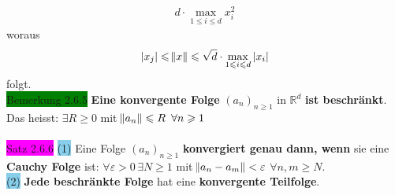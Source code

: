 \documentclass[landscape, 10pt]{article}
\newcommand{\R}{\mathbb{R}}
\begin{document}
\begin{multicols}{3}
\begin{align*}
                            d\cdot \max\limits_{1\leqslant i\leqslant d}x_i^2
                     \end{align*}
                     woraus 
                     \begin{equation*}
                            |x_j|\leqslant \norm{x}\leqslant
                            \sqrt{d}\cdot\max
                            \limits_{1\leqslant i\leqslant d}|x_i|
                     \end{equation*}
                     folgt.\\
              \colorbox{green}{Bemerkung 2.6.5} 
                     \textbf{Eine konvergente Folge} 
                     \textcolor{NavyBlue}{$(a_n)_{n\geqslant1}$} in 
                     \textcolor{NavyBlue}{$\R^d$}
                     \textbf{ist beschränkt}. Das heisst: 
                     \textcolor{NavyBlue}{$\exists R\geqslant0$} mit 
                     \textcolor{NavyBlue}{
                     $\norm{a_n}\leqslant R\enspace\forall n\geqslant1$}\\
              \\
              \colorbox{magenta}{Satz 2.6.6} 
                     \colorbox{SkyBlue}{(1)} 
                            Eine Folge $(a_n)_{n\geqslant1}$ 
                            \textbf{konvergiert genau dann, wenn} sie eine 
                            \textbf{Cauchy Folge} ist: 
                            \textcolor{NavyBlue}{
                            $\forall\varepsilon >0\,\exists N\geqslant1$} mit 
                            \textcolor{NavyBlue}{
                            $\norm{a_n-a_m}<\varepsilon$
                            \quad$\forall n,m\geqslant N$}.\\
                     \colorbox{SkyBlue}{(2)} 
                            \textbf{Jede beschränkte Folge} hat eine 
                            \textbf{konvergente Teilfolge}.\\

\end{multicols}
\end{document}
